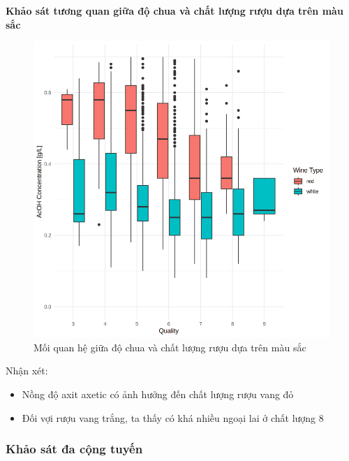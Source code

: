\textbf{Khảo sát tương quan giữa độ chua và chất lượng rượu dựa trên màu sắc}
\begin{figure}[H]
    \centering
    \includegraphics[width=0.75\columnwidth]{wine_colors/wine_volatile_acidity_quality_color.png}
    \caption{Mối quan hệ giữa độ chua và chất lượng rượu dựa trên màu sắc}
    \label{fig:wine_volatile_acidity_quality_color}
\end{figure}
Nhận xét:
\begin{itemize}
    \item Nồng độ axit axetic có ảnh hưởng đến chất lượng rượu vang đỏ
    \item Đối vợi rượu vang trắng, ta thấy có khá nhiều ngoại lai ở chất lượng 8
\end{itemize}

\subsubsection{Khảo sát đa cộng tuyến}

